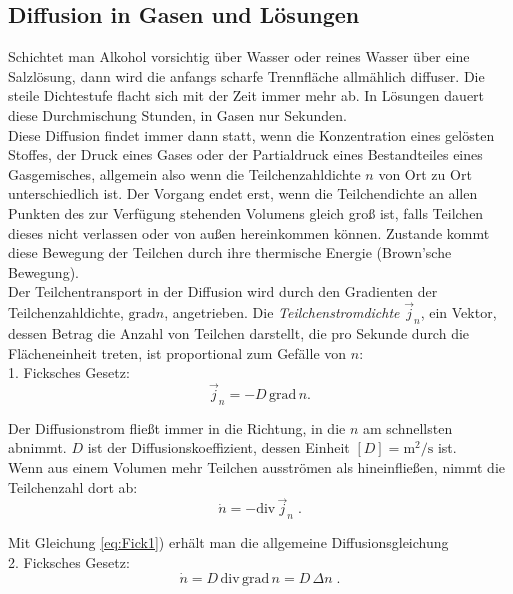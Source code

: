 \subsection{Diffusion in Gasen und Lösungen}

Schichtet man Alkohol vorsichtig über Wasser oder reines Wasser über eine Salzlösung, dann wird die anfangs scharfe Trennfläche allmählich diffuser. Die steile Dichtestufe flacht sich mit der Zeit immer mehr ab. In Lösungen dauert diese Durchmischung Stunden, in Gasen nur Sekunden.\\
Diese Diffusion findet immer dann statt, wenn die Konzentration eines gelösten Stoffes, der Druck eines Gases oder der Partialdruck eines Bestandteiles eines Gasgemisches, allgemein also wenn die Teilchenzahldichte $n$ von Ort zu Ort unterschiedlich ist. Der Vorgang endet erst, wenn die Teilchendichte an allen Punkten des zur Verfügung stehenden Volumens gleich groß ist, falls Teilchen dieses nicht verlassen oder von außen hereinkommen können. Zustande kommt diese Bewegung der Teilchen durch ihre thermische Energie (Brown'sche Bewegung).\\
Der Teilchentransport in der Diffusion wird durch den Gradienten der Teilchenzahldichte, $\mathrm{grad} n$, angetrieben. Die \textit{Teilchenstromdichte} $\vec{j}_n$, ein Vektor, dessen Betrag die Anzahl von Teilchen darstellt, die pro Sekunde durch die Flächeneinheit treten, ist proportional zum Gefälle von $n$:\\

1. Ficksches Gesetz:
\begin{equation}
 \vec{j}_n = -D\,\mathrm{grad}\, n.
 \label{eq:Fick1}
\end{equation}

Der Diffusionstrom fließt immer in die Richtung, in die $n$ am schnellsten abnimmt. $D$ ist der Diffusionskoeffizient, dessen Einheit $\left[D\right] = \mathrm{m^2/s}$ ist.\\

Wenn aus einem Volumen mehr Teilchen ausströmen als hineinfließen, nimmt die Teilchenzahl dort ab:
\begin{equation}
 \dot{n} = -\mathrm{div}\,\vec{j}_n\; .
\end{equation}

Mit Gleichung \ref{eq:Fick1}) erhält man die allgemeine Diffusionsgleichung\\

2. Ficksches Gesetz:
\begin{equation}
 \dot{n} = D\,\mathrm{div}\,\mathrm{grad}\, n = D\,\Delta n\; .
\end{equation}

